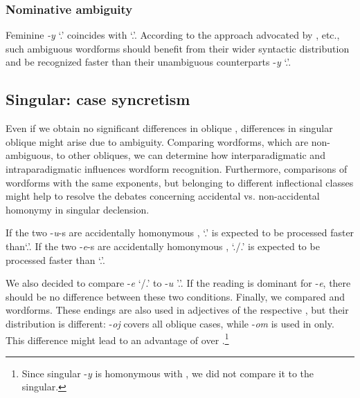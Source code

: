 \documentclass[output=paper, modfonts,newtxmath,hidelinks]{langscibook}
\begin{document}
\subsubsection{{Nominative ambiguity}}
Feminine \textit{-y} `\nomm.\pl' coincides with `\genn.\sg'. According to the approach advocated by \citet{kostic1991informational}, etc., such ambiguous wordforms should benefit from their wider syntactic distribution and be recognized faster than their unambiguous  counterparts -\textit{y} `\nomm.\pl'.

\subsection{Singular: case syncretism}
Even if we obtain no significant differences in  oblique , differences in singular oblique  might arise due to ambiguity. Comparing  wordforms, which are non-ambiguous, to other obliques, we can determine how interparadigmatic and intraparadigmatic  influences wordform recognition. Furthermore, comparisons of wordforms with the same exponents, but belonging to different inflectional classes might help to  resolve the debates concerning accidental vs. non-accidental homo\-nymy in  singular declension.

If the two -\textit{u}-s are accidentally homonymous  \citep{wiese2004categories}, `\accc.\fem' is expected to be processed faster than`\datt.\masc'. If the two -\textit{e}-s are accidentally homonymous \citep{muller2004decomposing}, `\datt./\locc.\fem' is expected to be processed faster than `\locc.\masc'.

We also decided to compare -\textit{e} `\datt/\locc.\fem' to -\textit{u} '\datt.\masc'. If the  reading is dominant for -\textit{e}, there should be no difference between these two conditions. Finally, we compared  and   wordforms. These endings are also used in adjectives of the respective , but their distribution is different:  -\textit{oj} covers all oblique cases, while  -\textit{om} is used in  only. This difference might lead to an advantage of   over  .\footnote{ Since   singular -\textit{y} is homonymous with  , we did not compare it to the   singular.}
\end{document}

